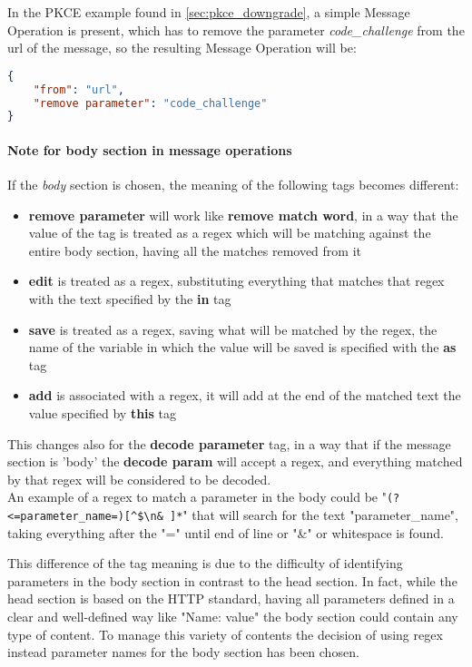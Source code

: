 In the \gls{PKCE} example found in \ref{sec:pkce_downgrade}, a simple Message Operation is present, which has to remove the parameter \textit{code\_challenge} from the url of the message, so the resulting Message Operation will be:
\begin{lstlisting}[language=json, caption=Message Operation definition]
{
    "from": "url",
    "remove parameter": "code_challenge"
}
\end{lstlisting}

\paragraph{Note for body section in message operations}
If the \textit{body} section is chosen, the meaning of the following tags becomes different:
\begin{itemize}
    \item \textbf{remove parameter} will work like \textbf{remove match word}, in a way that the value of the tag is treated as a regex which will be matching against the entire body section, having all the matches removed from it
    \item \textbf{edit} is treated as a regex, substituting everything that matches that regex with the text specified by the \textbf{in} tag
    \item \textbf{save} is treated as a regex, saving what will be matched by the regex, the name of the variable in which the value will be saved is specified with the \textbf{as} tag
    \item \textbf{add} is associated with a regex, it will add at the end of the matched text the value specified by \textbf{this} tag
\end{itemize}

This changes also for the \textbf{decode parameter} tag, in a way that if the message section is 'body' the \textbf{decode param} will accept a regex, and everything matched by that regex will be considered to be decoded. \\ An example of a regex to match a parameter in the body could be "\verb|(?<=parameter_name=)[^$\n& ]*|" that will search for the text "parameter\_name", taking everything after the "=" until end of line or "\&" or whitespace is found.

This difference of the tag meaning is due to the difficulty of identifying parameters in the body section in contrast to the head section. In fact, while the head section is based on the HTTP standard, having all parameters defined in a clear and well-defined way like "Name: value" the body section could contain any type of content. To manage this variety of contents the decision of using regex instead parameter names for the body section has been chosen.

